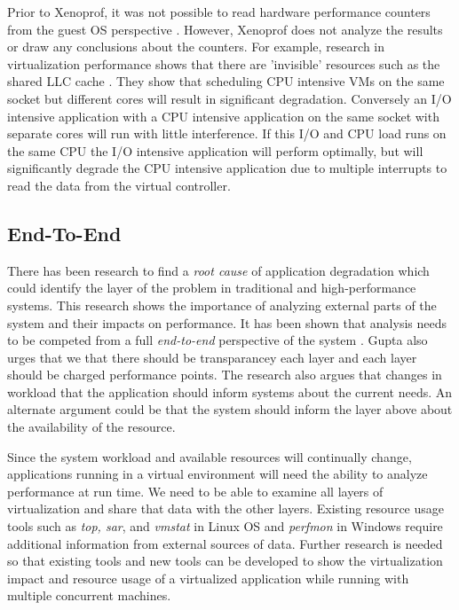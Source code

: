\indent Prior to Xenoprof, it was not possible to read hardware performance counters from the guest OS perspective \cite{menon, du2}.  However, Xenoprof does not analyze the results or draw any conclusions about the counters.  For example, research in virtualization performance shows that there are 'invisible' resources such as the shared LLC cache \cite{tickoo}.  They show that scheduling CPU intensive VMs on the same socket but different cores will result in significant degradation.  Conversely an I/O intensive application with a CPU intensive application on the same socket with separate cores will run with little interference.  If this I/O and CPU load runs on the same CPU the I/O intensive application will perform optimally, but will significantly degrade the CPU intensive application due to multiple interrupts to read the data from the virtual controller.

\subsection{End-To-End}
\indent There has been research to find a \emph{root cause} of application degradation which could identify the layer of the problem in traditional \cite{traeger} and high-performance \cite{knapp1} systems.  This research shows the importance of analyzing external parts of the system and their impacts on performance.  It has been shown that analysis needs to be competed from a full \emph{end-to-end} perspective of the system \cite{saltzer}.  Gupta \cite{gupta1} also urges that we that there should be transparancey each layer and each layer should be charged performance points.  The research also argues that changes in workload that the application should inform systems about the current needs.  An alternate argument could be that the system should inform the layer above about the availability of the resource.  

\indent Since the system workload and available resources will continually change, applications running in a virtual environment will need the ability to analyze performance at run time.  We need to be able to examine all layers of virtualization and share that data with the other layers.
Existing resource usage tools such as \emph{top, sar}, and \emph{vmstat} in Linux OS and \emph{perfmon} in Windows require additional information from external sources of data.  
Further research is needed so that existing tools and new tools can be developed to show the virtualization impact and resource usage of a virtualized application while running with multiple concurrent machines.

